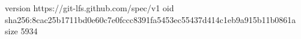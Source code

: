 version https://git-lfs.github.com/spec/v1
oid sha256:8cac25b1711bd0e60c7e0fccc8391fa5453ec55437d414c1eb9a915b11b0861a
size 5934
